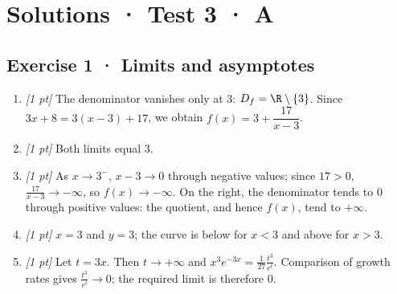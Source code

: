 \ifprof\clearpage

\section*{Solutions · Test 3 · A}\label{cor:4-3}

\subsection*{Exercise 1 · Limits and asymptotes}\begin{enumerate}

\item \textit{[1 pt]} The denominator vanishes only at $3$: $D_f=\R\setminus\{3\}$. Since $3x+8=3(x-3)+17$, we obtain $f(x)=3+\dfrac{17}{x-3}$.

\item \textit{[1 pt]} Both limits equal $3$.

\item \textit{[1 pt]} As $x\to 3^-$, $x-3\to0$ through negative values; since $17>0$, $\frac{17}{x-3}\to-\infty$, so $f(x)\to-\infty$. On the right, the denominator tends to $0$ through positive values: the quotient, and hence $f(x)$, tend to $+\infty$.

\item \textit{[1 pt]} $x=3$ and $y=3$; the curve is below for $x<3$ and above for $x>3$.

\item \textit{[1 pt]} Let $t=3x$. Then $t\to+\infty$ and $x^3e^{-3x}=\frac{1}{27}\frac{t^3}{e^t}$. Comparison of growth rates gives $\frac{t^3}{e^t}\to0$; the required limit is therefore $0$.

\end{enumerate}

